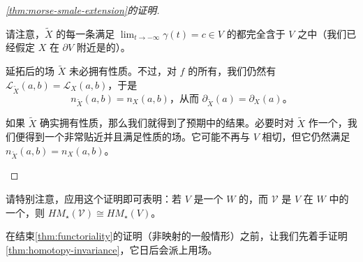 \begin{proof}[\cref{thm:morse-smale-extension}的证明]
\begin{remark}\label{thm:trajectory-contained-in-v}
请注意，$\widetilde X$ 的每一条满足 $\lim_{t\to-\infty}\gamma(t)=c\in V$ 的\trTrajectory{}都完全含于 $V$ 之中（我们已经假定 $X$ 在 $\partial V$ 附近是\trIncoming{}的）。

延拓后的场 $\widetilde X$ 未必拥有\trSmale{}性质。不过，对 $f$ 的所有\trCriticalPoint，我们仍然有 $\mathcal{L}_{\widetilde X}(a,b)=\mathcal{L}_X(a,b)$，于是
\[
n_{\widetilde X}(a,b)=n_X(a,b)\text{，从而 }\partial_{\widetilde X}(a)=\partial_X(a)\text{。}
\]

如果 $\widetilde X$ 确实拥有\trSmale{}性质，那么我们就得到了预期中的结果。必要时对 $\widetilde X$ 作一个\trPerturbation，我们便得到一个非常贴近并且满足\trSmale{}性质的场。它可能不再与 $V$ 相切，但它仍然满足 $n_{\widetilde X}(a,b)=n_X(a,b)$。
\end{remark}
\end{proof}

\begin{remark}\label{thm:tubular-neighborhood-homology}
请特别注意，应用这个证明即可表明：若 $V$ 是一个\trManifold{} $W$ 的\trSubmanifold，而 $\mathcal{V}$ 是 $V$ 在 $W$ 中的一个\trTubularNeighborhood，则 $HM_\star(\mathcal{V})\cong HM_\star(V)$。
\end{remark}

在结束\cref{thm:functoriality}的证明（非\trEmbedding{}映射的一般情形）之前，让我们先着手证明\cref{thm:homotopy-invariance}，它日后会派上用场。

